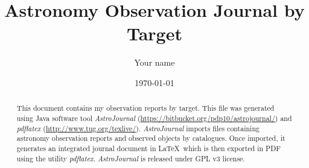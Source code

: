 \documentclass[10pt,twoside,a4paper,english]{article}
\title{Astronomy Observation Journal by Target}
\author{Your name}
\date{\today}
\begin{document}
\maketitle
\thispagestyle{empty}

\begin{abstract}
This document contains my observation reports by target. This file was generated using Java software tool {\it AstroJournal} (\href{https://bitbucket.org/pdp10/astrojournal/}{https://bitbucket.org/pdp10/astrojournal/}) and {\it pdflatex} (\href{http://www.tug.org/texlive/}{http://www.tug.org/texlive/}). {\it AstroJournal} imports files containing astronomy observation reports and observed objects by catalogues. Once imported, it generates an integrated journal document in \LaTeX\ which is then exported in PDF using the utility {\it pdflatex}. {\it AstroJournal} is released under GPL v3 license.
\end{abstract}

\tableofcontents


\clearpage


\small

\clearpage


\normalsize
\end{document}

